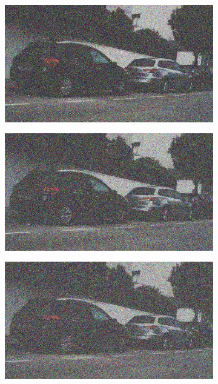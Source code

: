 \documentclass[a4paper]{ctexart}
\begin{document}
\begin{figure}[htbp]
\begin{subfigure}{0.08\textwidth}
			\label{fig：Gamma=0.2, Gauss Noise = 0.7}
		\end{subfigure}
		\begin{subfigure}{0.08\textwidth}
			\captionsetup{font=scriptsize}
			\includegraphics[width=\linewidth]{picture/Edge Detection/degrade/RGB_001 Gamma=0.2, Gauss Noise=0.8}
			\label{fig：Gamma=0.2, Gauss Noise = 0.8}
		\end{subfigure}
		\begin{subfigure}{0.08\textwidth}
			\captionsetup{font=scriptsize}
			\includegraphics[width=\linewidth]{picture/Edge Detection/degrade/RGB_001 Gamma=0.2, Gauss Noise=0.9}
			\label{fig：Gamma=0.2, Gauss Noise = 0.9}
		\end{subfigure}
		\begin{subfigure}{0.08\textwidth}
			\captionsetup{font=scriptsize}
			\includegraphics[width=\linewidth]{picture/Edge Detection/degrade/RGB_001 Gamma=0.2, Gauss Noise=1.0}

\end{subfigure}
\end{figure}
\end{document}
